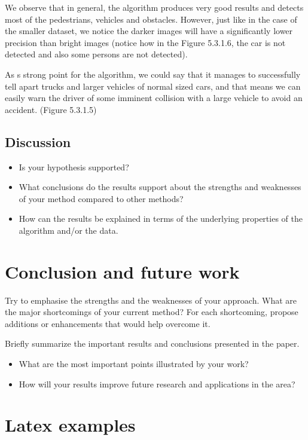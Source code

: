 \documentclass[runningheads,a4paper,11pt]{report}
\begin{document}
 We observe that in general, the algorithm produces very good results and detects most of the pedestrians, vehicles and obstacles.
However, just like in the case of the smaller dataset, we notice the darker images will have a significantly lower precision than bright images (notice how in the Figure 5.3.1.6, the car is not detected and also some persons are not detected).

As s strong point for the algorithm, we could say that it manages to successfully tell apart trucks and larger vehicles of normal sized cars, and that means we can easily warn the driver of some imminent collision with a large vehicle to avoid an accident. (Figure 5.3.1.5)



\section{Discussion}
\label{section:discussion}

\begin{itemize}
	\item Is your hypothesis supported? 
	\item What conclusions do the results support about the strengths and weaknesses of your method compared to other methods? 
	\item How can the results be explained in terms of the underlying properties of the algorithm and/or the data. 
\end{itemize}


\chapter{Conclusion and future work}
\label{chapter:concl}

Try to emphasise the strengths and the weaknesses of your approach.
What are the major shortcomings of your current method? For each shortcoming, propose additions or enhancements that would help overcome it. 

Briefly summarize the important results and conclusions presented in the paper. 

\begin{itemize}
	\item What are the most important points illustrated by your work? 
	\item How will your results improve future research and applications in the area? 
\end{itemize}


\chapter{Latex examples}
\end{document}
